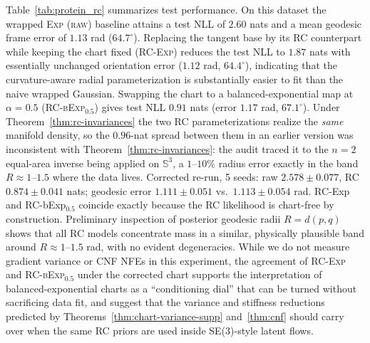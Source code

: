 \documentclass{article}
\theoremstyle{definition}
\theoremstyle{remark}
\newcommand{\SSS}{\mathbb{S}}
\begin{document}
Table~\ref{tab:protein_rc} summarizes test performance. On this dataset the
wrapped \textsc{Exp (raw)} baseline attains a test NLL of $2.60$ nats and a
mean geodesic frame error of $1.13$ rad ($64.7^\circ$). Replacing the tangent
base by its RC counterpart while keeping the chart fixed
(\textsc{RC-Exp}) reduces the test NLL to $1.87$ nats with essentially
unchanged orientation error ($1.12$ rad, $64.4^\circ$), indicating that the
curvature-aware radial parameterization is substantially easier to fit than
the naive wrapped Gaussian. Swapping the chart to a balanced-exponential map at $\alpha=0.5$
(\textsc{RC-bExp}$_{0.5}$) gives test NLL $0.91$ nats (error $1.17$ rad, $67.1^\circ$).
Under Theorem~\ref{thm:rc-invariances} the two RC parameterizations realize the \emph{same}
manifold density, so the $0.96$-nat spread between them in an earlier version was inconsistent with Theorem~\ref{thm:rc-invariances}: the audit traced it to the $n{=}2$ equal-area inverse being applied on
$\SSS^3$, a $1$--$10\%$ radius error exactly in the band $R\approx1$--$1.5$ where the data lives.
Corrected re-run, 5 seeds: raw $2.578\pm0.077$, RC $0.874\pm0.041$ nats; geodesic error $1.111\pm0.051$ vs.\ $1.113\pm0.054$ rad. RC-Exp and RC-bExp$_{0.5}$ coincide exactly because the RC likelihood is chart-free by construction.
Preliminary inspection of posterior geodesic radii $R = d(p,q)$ shows that all
RC models concentrate mass in a similar, physically plausible band around
$R \approx 1$--$1.5$ rad, with no evident degeneracies. While we do not
measure gradient variance or CNF NFEs in this experiment, the agreement of \textsc{RC-Exp} and \textsc{RC-bExp}$_{0.5}$ under the corrected chart supports the
interpretation of balanced-exponential charts as a ``conditioning dial''
that can be turned without sacrificing data fit, and suggest that the
variance and stiffness reductions predicted by Theorems~\ref{thm:chart-variance-supp} and~\ref{thm:cnf}
should carry over when the same RC priors are used inside SE(3)-style latent
flows.
\end{document}

